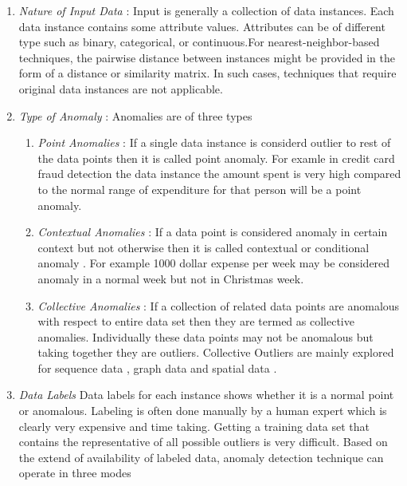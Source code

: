 \begin{enumerate}
	\item \textit{Nature of Input Data} : Input
	is generally a collection of data instances. Each data instance contains some attribute values. Attributes can be of different type such as binary, categorical, or continuous.For nearest-neighbor-based techniques, the pairwise distance between instances might be
	provided in the form of a distance or similarity matrix. In such cases, techniques that
	require original data instances are not applicable.
	
	\item \textit{Type of Anomaly} :  
	Anomalies are of three types
	\begin{enumerate}
		\item \textit{Point Anomalies} : If a single data instance is considerd outlier to rest of the data points then it is called point anomaly. For examle in credit card  fraud detection the data instance the amount spent is very high compared to the normal range of expenditure
		for that person will be a point anomaly.
		
		\item \textit{Contextual Anomalies} : If a data point is considered anomaly in certain context but not otherwise then it  is called contextual or conditional anomaly \cite{contextual}. For example 1000 dollar expense per week may be considered anomaly in a normal week but not in Christmas week.
		
		\item \textit{Collective Anomalies} : If a collection of related data points are anomalous with respect to entire data set then they are termed as collective anomalies. Individually these data points may not be anomalous but taking together they are outliers. Collective Outliers are mainly explored for sequence data \cite{ca1},
		graph data \cite{ca2} and spatial data \cite{ca3}.
	\end{enumerate}
	
	
	
	\item \textit{Data Labels}
	Data labels for each instance shows whether it is a normal point or anomalous. Labeling is often done manually by a human expert which is clearly very expensive and time taking. Getting a training data set that contains the representative of all possible outliers is very difficult. Based on the extend of availability of labeled data, anomaly detection technique can operate in three modes
	

\end{enumerate}
